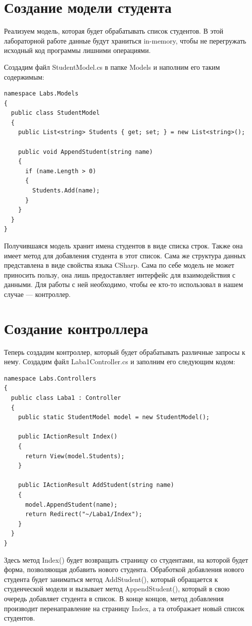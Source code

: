 \documentclass[a4paper,14pt]{extreport}
\begin{document}
\section{Создание модели студента}
Реализуем модель, которая будет обрабатывать список студентов. В этой лабораторной работе данные будут храниться in-memory, чтобы не перегружать исходный код программы лишними операциями.

Создадим файл StudentModel.cs в папке Models и наполним его таким содержимым:
\lstset{language=c++}
\begin{lstlisting}[basicstyle=\small]
namespace Labs.Models
{
  public class StudentModel
  {
    public List<string> Students { get; set; } = new List<string>();

    public void AppendStudent(string name)
    {
      if (name.Length > 0)
      {
        Students.Add(name);
      }
    }
  }
}
\end{lstlisting}

Получившаяся модель хранит имена студентов в виде списка строк. Также она имеет метод для добавления студента в этот список. Сама же структура данных представлена в виде свойства языка CSharp. Сама по себе модель не может приносить пользу, она лишь предоставляет интерфейс для взаимодействия с данными. Для работы с ней необходимо, чтобы ее кто-то использовал в нашем случае --- контроллер.



\section{Создание контроллера}
Теперь создадим контроллер, который будет обрабатывать различные запросы к нему. Создадим файл Laba1Controller.cs и заполним его следующим кодом:

\lstset{language=c++}
\begin{lstlisting}[basicstyle=\small]
namespace Labs.Controllers
{
  public class Laba1 : Controller
  {
    public static StudentModel model = new StudentModel();

    public IActionResult Index()
    {
      return View(model.Students);
    }

    public IActionResult AddStudent(string name)
    {
      model.AppendStudent(name);
      return Redirect("~/Laba1/Index");
    }
  }
}
\end{lstlisting}

Здесь метод Index() будет возвращать страницу со студентами, на которой будет форма, позволяющая добавить нового студента. Обработкой добавления нового студента будет заниматься метод AddStudent(), который обращается к студенческой модели и вызывает метод AppendStudent(), который в свою очередь добавляет студента в список. В конце концов, метод добавления производит перенаправление на страницу Index, а та отображает новый список студентов.
\end{document}
